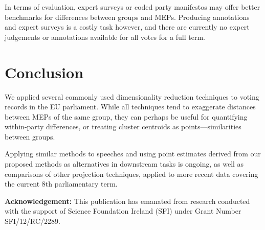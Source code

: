 \documentclass{llncs}
\begin{document}
In terms of evaluation, expert surveys \cite{mcelroy2012policy} or coded party manifestos \cite{manifesto} may offer better benchmarks for differences between groups and MEPs. Producing annotations and expert surveys is a costly task however, and there are currently no expert judgements or annotations available for all votes for a full term.

\section{Conclusion}
We applied several commonly used dimensionality reduction techniques to voting records in the EU parliament. While all techniques tend to exaggerate distances between MEPs of the same group, they can perhaps be useful for quantifying within-party differences, or treating cluster centroids as points---similarities between groups.

Applying similar methods to speeches and using point estimates derived from our proposed methods as alternatives in downstream tasks is ongoing, as well as comparisons of other projection techniques, applied to more recent data covering the current 8th parliamentary term.

\vspace{3mm}
\noindent\textbf{Acknowledgement:} This publication has emanated from research conducted with the support of Science Foundation Ireland (SFI) under Grant Number SFI/12/RC/2289.


 
\end{document}
